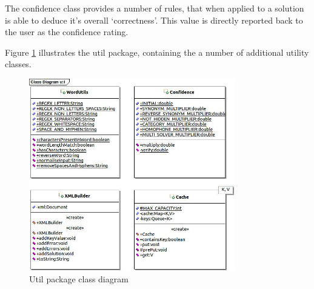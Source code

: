 The confidence class provides a number of rules, that when applied to a solution
is able to deduce it's overall `correctness'. This value is directly reported 
back to the user as the confidence rating.

Figure \ref{fig:util_package} illustrates the util package, containing the
a number of additional utility classes.

\begin{figure}[H]
  \centering
  \includegraphics[width=0.8\textwidth]{class/util.jpg}
  \caption{Util package class diagram}
  \label{fig:util_package}
\end{figure}
